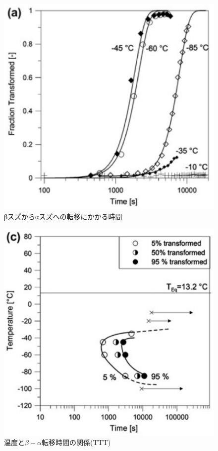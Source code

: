 \begin{figure}[!h]
\begin{minipage}{0.5\hsize}
\begin{center}
   \includegraphics[width=\hsize]{Introduction/beta-to-alpha.eps}
  \end{center}
  \caption{βスズからαスズへの転移にかかる時間}
  \label{fig:beta-to-alpha}
 \end{minipage}
\end{figure}

\begin{figure}[!h]
    \begin{center}
   \includegraphics[width=130mm]{Introduction/TTT.eps}
  \end{center}
  \caption{温度と$\beta-\alpha$転移時間の関係(TTT)\cite{Nogita}}
  \label{fig:TTT}
\end{figure}

